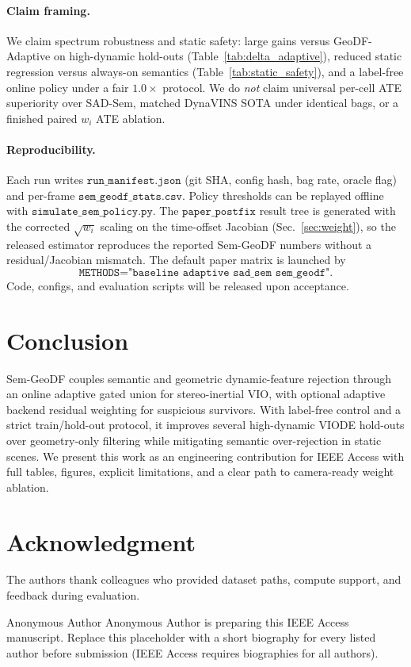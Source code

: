 \documentclass{ieeeaccess}
\begin{document}
\paragraph{Claim framing.}
We claim spectrum robustness and static safety: large gains versus GeoDF-Adaptive on high-dynamic hold-outs (Table~\ref{tab:delta_adaptive}), reduced static regression versus always-on semantics (Table~\ref{tab:static_safety}), and a label-free online policy under a fair \(1.0\times\) protocol.
We do \emph{not} claim universal per-cell ATE superiority over SAD-Sem, matched DynaVINS SOTA under identical bags, or a finished paired \(w_i\) ATE ablation.

\paragraph{Reproducibility.}
Each run writes \(\texttt{run\_manifest.json}\) (git SHA, config hash, bag rate, oracle flag) and per-frame \(\texttt{sem\_geodf\_stats.csv}\).
Policy thresholds can be replayed offline with \(\texttt{simulate\_sem\_policy.py}\).
The \(\texttt{paper\_postfix}\) result tree is generated with the corrected \(\sqrt{w_i}\) scaling on the time-offset Jacobian (Sec.~\ref{sec:weight}), so the released estimator reproduces the reported Sem-GeoDF numbers without a residual/Jacobian mismatch.
The default paper matrix is launched by
\[\texttt{METHODS="baseline adaptive sad\_sem sem\_geodf"}.\]
Code, configs, and evaluation scripts will be released upon acceptance.

\section{Conclusion}
\label{sec:conclusion}
Sem-GeoDF couples semantic and geometric dynamic-feature rejection through an online adaptive gated union for stereo-inertial VIO, with optional adaptive backend residual weighting for suspicious survivors.
With label-free control and a strict train/hold-out protocol, it improves several high-dynamic VIODE hold-outs over geometry-only filtering while mitigating semantic over-rejection in static scenes.
We present this work as an engineering contribution for IEEE Access with full tables, figures, explicit limitations, and a clear path to camera-ready weight ablation.

\section*{Acknowledgment}
The authors thank colleagues who provided dataset paths, compute support, and feedback during evaluation.




\begin{IEEEbiographynophoto}{Anonymous Author}
Anonymous Author is preparing this IEEE Access manuscript.
Replace this placeholder with a short biography for every listed author before submission
(IEEE Access requires biographies for all authors).
\end{IEEEbiographynophoto}

\EOD
\end{document}
